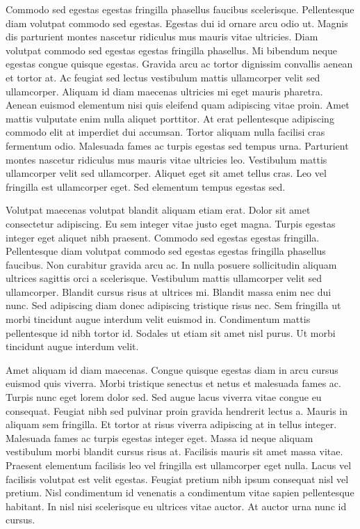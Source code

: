 \documentclass[11pt,a4paper]{article}
\begin{document}
Commodo sed egestas egestas fringilla phasellus faucibus scelerisque. Pellentesque diam volutpat commodo sed egestas. Egestas dui id ornare arcu odio ut. Magnis dis parturient montes nascetur ridiculus mus mauris vitae ultricies. Diam volutpat commodo sed egestas egestas fringilla phasellus. Mi bibendum neque egestas congue quisque egestas. Gravida arcu ac tortor dignissim convallis aenean et tortor at. Ac feugiat sed lectus vestibulum mattis ullamcorper velit sed ullamcorper. Aliquam id diam maecenas ultricies mi eget mauris pharetra. Aenean euismod elementum nisi quis eleifend quam adipiscing vitae proin. Amet mattis vulputate enim nulla aliquet porttitor. At erat pellentesque adipiscing commodo elit at imperdiet dui accumsan. Tortor aliquam nulla facilisi cras fermentum odio. Malesuada fames ac turpis egestas sed tempus urna. Parturient montes nascetur ridiculus mus mauris vitae ultricies leo. Vestibulum mattis ullamcorper velit sed ullamcorper. Aliquet eget sit amet tellus cras. Leo vel fringilla est ullamcorper eget. Sed elementum tempus egestas sed.

Volutpat maecenas volutpat blandit aliquam etiam erat. Dolor sit amet consectetur adipiscing. Eu sem integer vitae justo eget magna. Turpis egestas integer eget aliquet nibh praesent. Commodo sed egestas egestas fringilla. Pellentesque diam volutpat commodo sed egestas egestas fringilla phasellus faucibus. Non curabitur gravida arcu ac. In nulla posuere sollicitudin aliquam ultrices sagittis orci a scelerisque. Vestibulum mattis ullamcorper velit sed ullamcorper. Blandit cursus risus at ultrices mi. Blandit massa enim nec dui nunc. Sed adipiscing diam donec adipiscing tristique risus nec. Sem fringilla ut morbi tincidunt augue interdum velit euismod in. Condimentum mattis pellentesque id nibh tortor id. Sodales ut etiam sit amet nisl purus. Ut morbi tincidunt augue interdum velit.

Amet aliquam id diam maecenas. Congue quisque egestas diam in arcu cursus euismod quis viverra. Morbi tristique senectus et netus et malesuada fames ac. Turpis nunc eget lorem dolor sed. Sed augue lacus viverra vitae congue eu consequat. Feugiat nibh sed pulvinar proin gravida hendrerit lectus a. Mauris in aliquam sem fringilla. Et tortor at risus viverra adipiscing at in tellus integer. Malesuada fames ac turpis egestas integer eget. Massa id neque aliquam vestibulum morbi blandit cursus risus at. Facilisis mauris sit amet massa vitae. Praesent elementum facilisis leo vel fringilla est ullamcorper eget nulla. Lacus vel facilisis volutpat est velit egestas. Feugiat pretium nibh ipsum consequat nisl vel pretium. Nisl condimentum id venenatis a condimentum vitae sapien pellentesque habitant. In nisl nisi scelerisque eu ultrices vitae auctor. At auctor urna nunc id cursus.
\end{document}
